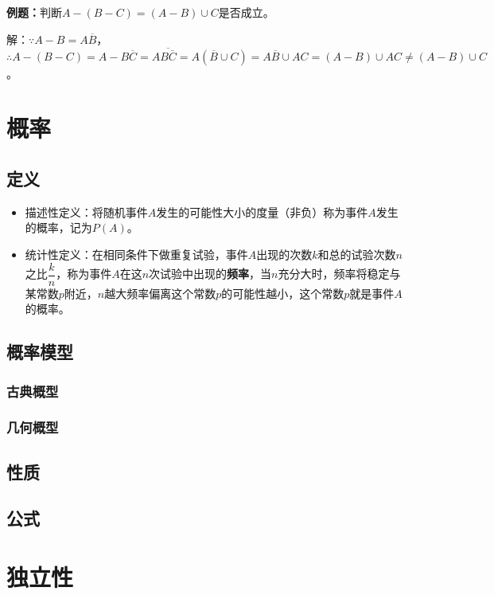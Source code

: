 \documentclass[UTF8, 12pt]{ctexart}
\begin{document}
\textbf{例题：}判断$A-(B-C)=(A-B)\cup C$是否成立。

解：$\because A-B=A\overline{B}$，$\therefore A-(B-C)=A-B\overline{C}=A\overline{B\overline{C}}=A(\overline{B}\cup C)=A\overline{B}\cup AC=(A-B)\cup AC\neq (A-B)\cup C$。

\section{概率}

\subsection{定义}

\begin{itemize}
    \item 描述性定义：将随机事件$A$发生的可能性大小的度量（非负）称为事件$A$发生的概率，记为$P(A)$。
    \item 统计性定义：在相同条件下做重复试验，事件$A$出现的次数$k$和总的试验次数$n$之比$\dfrac{k}{n}$，称为事件$A$在这$n$次试验中出现的\textbf{频率}，当$n$充分大时，频率将稳定与某常数$p$附近，$n$越大频率偏离这个常数$p$的可能性越小，这个常数$p$就是事件$A$的概率。
\end{itemize}

\subsection{概率模型}

\subsubsection{古典概型}

\subsubsection{几何概型}

\subsection{性质}

\subsection{公式}

\section{独立性}
\end{document}
